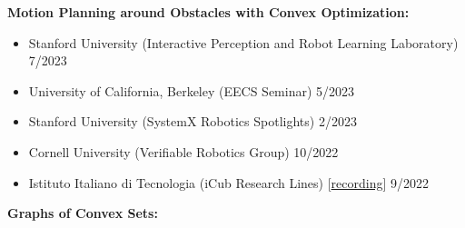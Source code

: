 \documentclass[11pt,a4paper,sans,twoside]{moderncv}
\begin{document}
\textbf{Motion Planning around Obstacles with Convex Optimization:}

\begin{itemize}

\item Stanford University (Interactive Perception and Robot Learning Laboratory) \hfill 7/2023
\item University of California, Berkeley (EECS Seminar) \hfill 5/2023
\item Stanford University (SystemX Robotics Spotlights) \hfill 2/2023
\item Cornell University (Verifiable Robotics Group) \hfill 10/2022
\item  Istituto Italiano di Tecnologia (iCub Research Lines) [\href{https://www.youtube.com/watch?v=FoqAAgqgn-o}{\color{orange}recording}] \hfill 9/2022

\end{itemize}


\textbf{Graphs of Convex Sets:}
\end{document}
